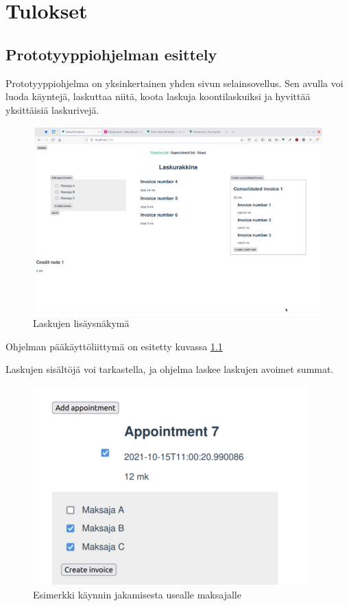 \hypertarget{tulokset}{%
\chapter{Tulokset}\label{tulokset}}

\hypertarget{prototyyppiohjelman-esittely}{%
\section{Prototyyppiohjelman
esittely}\label{prototyyppiohjelman-esittely}}

Prototyyppiohjelma on yksinkertainen yhden sivun selainsovellus. Sen
avulla voi luoda käyntejä, laskuttaa niitä, koota laskuja
koontilaskuiksi ja hyvittää yksittäisiä laskurivejä.

\begin{figure}
\centering
\includegraphics{illustration/screenshots/Laskurakkine.png}
\caption{\label{rakkine_default-view}Laskujen lisäysnäkymä}
\end{figure}

Ohjelman pääkäyttöliittymä on esitetty kuvassa
\ref{rakkine_default-view}

Laskujen sisältöjä voi tarkastella, ja ohjelma laskee laskujen avoimet
summat.

\begin{figure}
\centering
\includegraphics{illustration/screenshots/Dividing.png}
\caption{\label{rakkine_dividing}Esimerkki käynnin jakamisesta usealle
maksajalle}
\end{figure}

